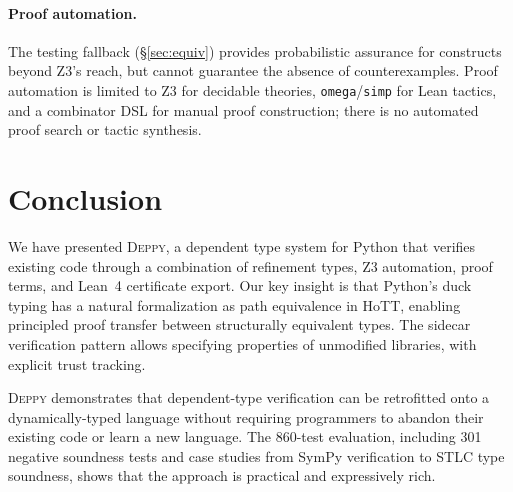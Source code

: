 \documentclass[acmsmall,nonacm,screen]{acmart}
\newcommand{\deppy}{\textsc{Deppy}}
\begin{document}
\paragraph{Proof automation.}
The testing fallback (\S\ref{sec:equiv}) provides probabilistic
assurance for constructs beyond Z3's reach, but cannot guarantee
the absence of counterexamples.  Proof automation is limited to
Z3 for decidable theories, \texttt{omega}/\texttt{simp} for Lean
tactics, and a combinator DSL for manual proof construction;
there is no automated proof search or tactic synthesis.



\section{Conclusion}\label{sec:conclusion}

We have presented \deppy{}, a dependent type system for Python that
verifies existing code through a combination of refinement types, Z3
automation, proof terms, and Lean~4 certificate export.  Our key
insight is that Python's duck typing has a natural formalization as
path equivalence in HoTT, enabling principled proof transfer between
structurally equivalent types.  The sidecar verification pattern
allows specifying properties of unmodified libraries, with explicit
trust tracking.

\deppy{} demonstrates that dependent-type verification can be
retrofitted onto a dynamically-typed language without requiring
programmers to abandon their existing code or learn a new language.
The 860-test evaluation, including 301 negative soundness tests and
case studies from SymPy verification to STLC type soundness, shows
that the approach is practical and expressively rich.



\end{document}
